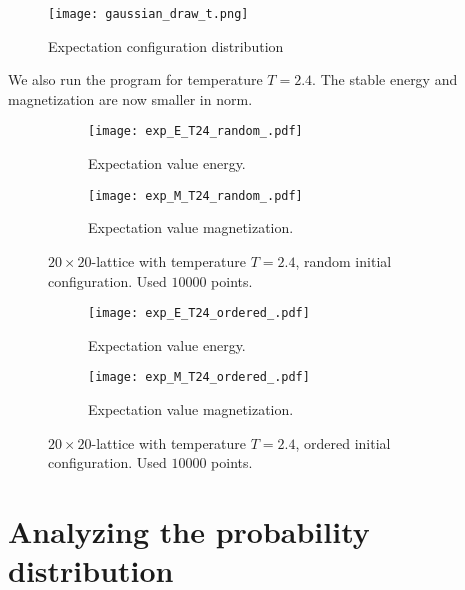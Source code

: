 \documentclass[11pt]{article}
\begin{document}
\begin{figure}
\centering
\texttt{[image: gaussian\_draw\_t.png]}
\caption{Expectation configuration distribution}
\end{figure}


\begin{flushleft}
We also run the program for temperature $T=2.4$. The stable energy and magnetization are now smaller in norm. 

\begin{figure}
\centering
\begin{subfigure}{.5\textwidth}
  \centering
  \texttt{[image: exp\_E\_T24\_random\_.pdf]}
  \caption{Expectation value energy.}
  \label{fig:sub1}
\end{subfigure}%
\begin{subfigure}{.5\textwidth}
  \centering
  \texttt{[image: exp\_M\_T24\_random\_.pdf]}
  \caption{Expectation value magnetization.}
  \label{fig:sub2}
\end{subfigure}
\caption{$20 \times 20$-lattice with temperature $T=2.4$, random initial configuration. Used $10000$ points.}
\label{fig:cms-EM T=2.4 random}
\end{figure}


\begin{figure}
\centering
\begin{subfigure}{.5\textwidth}
  \centering
  \texttt{[image: exp\_E\_T24\_ordered\_.pdf]}
  \caption{Expectation value energy.}
  \label{fig:sub1}
\end{subfigure}%
\begin{subfigure}{.5\textwidth}
  \centering
  \texttt{[image: exp\_M\_T24\_ordered\_.pdf]}
  \caption{Expectation value magnetization.}
  \label{fig:sub2}
\end{subfigure}
\caption{$20 \times 20$-lattice with temperature $T=2.4$, ordered initial configuration. Used $10000$ points.}
\label{fig:cms-EM T=2.4 random}
\end{figure}
\end{flushleft}


\section{Analyzing the probability distribution}
\end{document}
